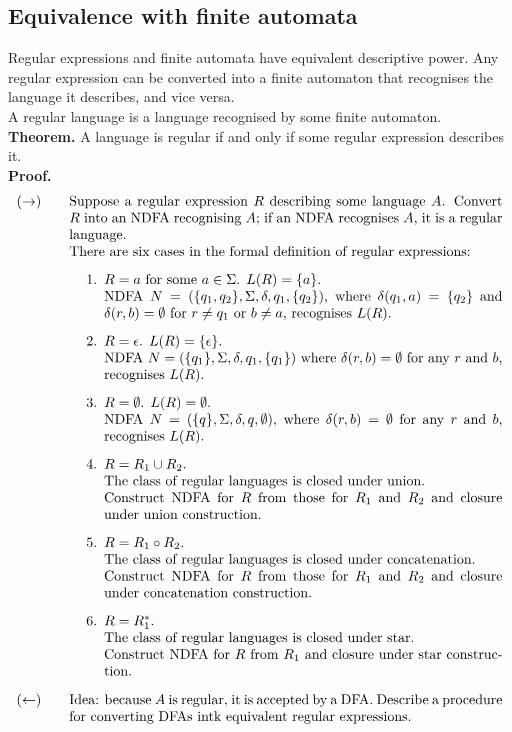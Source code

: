 \documentclass{article}
\begin{document}
\subsection{Equivalence with finite automata}
Regular expressions and finite automata have equivalent descriptive power. Any regular expression can be converted into a finite automaton that recognises the language it describes, and vice versa.\medskip
\\ A regular language is a language recognised by some finite automaton.\medskip
\\\textbf{Theorem.} A language is regular if and only if some regular expression describes it.\medskip
\\\textbf{Proof.}
\allowdisplaybreaks
\begin{align*}
(\rightarrow)\qquad&\parbox[t]{0.9\textwidth}{Suppose a regular expression $R$ describing some language $A$. Convert $R$ into an NDFA recognising $A$; if an NDFA recognises $A$, it is a regular language.
	\\ There are six cases in the formal definition of regular expressions:
	\begin{enumerate}
	\item $R = a$ for some $a \in \Sigma$. $L(R) = \{a\}$.
	\\ NDFA $N = (\{q_1, q_2\}, \Sigma, \delta, q_1, \{q_2\})$, where $\delta(q_1, a) = \{q_2\}$ and $\delta(r, b) = \emptyset$ for $r \neq q_1$ or $b \neq a$, recognises $L(R)$.
	\item $R = \epsilon$. $L(R) = \{\epsilon\}$.
	\\ NDFA $N = (\{q_1\}, \Sigma, \delta, q_1, \{q_1\})$ where $\delta(r, b) = \emptyset$ for any $r$ and $b$, recognises $L(R)$.
	\item $R = \emptyset$. $L(R) = \emptyset$.
	\\ NDFA $N = (\{q\}, \Sigma, \delta, q, \emptyset)$, where $\delta(r, b) = \emptyset$ for any $r$ and $b$, recognises $L(R)$.
	\item $R = R_1 \cup R_2$.
	\\ The class of regular languages is closed under union.
	\\ Construct NDFA for $R$ from those for $R_1$ and $R_2$ and closure under union construction.
	\item $R = R_1 \circ R_2$.
	\\ The class of regular languages is closed under concatenation.
	\\ Construct NDFA for $R$ from those for $R_1$ and $R_2$ and closure under concatenation construction.
	\item $R = R_1^*$.
	\\ The class of regular languages is closed under star.
	\\ Construct NDFA for $R$ from $R_1$ and closure under star construction.
	\end{enumerate}
} \\
(\leftarrow)\qquad&\parbox[t]{0.9\textwidth}{Idea: because $A$ is regular, it is accepted by a DFA. Describe a procedure for converting DFAs intk equivalent regular expressions.}
\end{align*}
\end{document}
